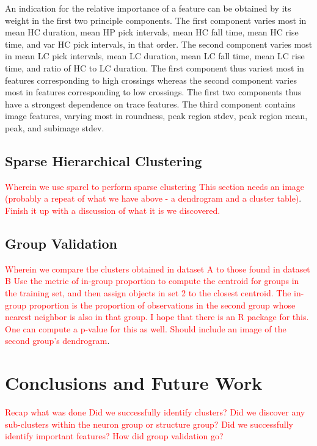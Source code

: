 \documentclass[10pt]{article}
\newcommand{\todo}[1]{\textcolor{red}{#1}}
\begin{document}
An indication for the relative importance of a feature can be obtained by its weight in the first two principle components.
The first component varies most in mean HC duration, mean HP pick intervals, mean HC fall time, mean HC rise time, and var HC pick intervals, in that order.
The second component varies most in mean LC pick intervals, mean LC duration, mean LC fall time, mean LC rise time, and ratio of HC to LC duration. 
The first component thus variest most in features corresponding to high crossings whereas the second component varies most in features corresponding to low crossings.
The first two components thus have a strongest dependence on trace features.
The third component contains image features, varying most in roundness, peak region stdev, peak region mean, peak, and subimage stdev.

\subsection{Sparse Hierarchical Clustering}

\todo{Wherein we use sparcl to perform sparse clustering}
\todo{This section needs an image (probably a repeat of what we have above - a dendrogram and a cluster table)}.
\todo{Finish it up with a discussion of what it is we discovered.}

\subsection{Group Validation}

\todo{Wherein we compare the clusters obtained in dataset A to those found in dataset B}
\todo{Use the metric of in-group proportion to compute the centroid for groups in the training set, and then assign objects in set 2 to the closest centroid. The in-group proportion is the proportion of observations in the second group whose nearest neighbor is also in that group. I hope that there is an R package for this.}
\todo{One can compute a p-value for this as well.}
\todo{Should include an image of the second group's dendrogram}.

\section{Conclusions and Future Work}

\todo{Recap what was done}
\todo{Did we successfully identify clusters?}
\todo{Did we discover any sub-clusters within the neuron group or structure group?}
\todo{Did we successfully identify important features?}
\todo{How did group validation go?}
\end{document}
